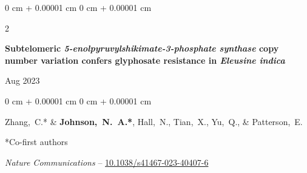 \documentclass[10pt, letterpaper]{article}
\newenvironment{onecolentry}{
    \begin{adjustwidth}{
        0 cm + 0.00001 cm
    }{
        0 cm + 0.00001 cm
    }
}{
    \end{adjustwidth}
} %
\newenvironment{twocolentry}[2][]{
    \onecolentry
    \def\secondColumn{#2}
    \setcolumnwidth{\fill, 4.5 cm}
    \begin{paracol}{2}
}{
    \switchcolumn \raggedleft \secondColumn
    \end{paracol}
    \endonecolentry
} %
\begin{document}
        \begin{samepage}
            \begin{twocolentry}{
                Aug 2023
            }
                \textbf{Subtelomeric \textit{5-enolpyruvylshikimate-3-phosphate synthase} copy number variation confers glyphosate resistance in \textit{Eleusine indica}}
            \end{twocolentry}

            \vspace{0.10 cm}
            
            \begin{onecolentry}
                \mbox{Zhang, C.}* \& \mbox{\textbf{Johnson, N. A.*}}, \mbox{Hall, N.}, \mbox{Tian, X.}, \mbox{Yu, Q.}, \& \mbox{Patterson, E.}

                \vspace{0.10 cm}

                *Co-first authors
                
                \vspace{0.10 cm}
                
                \textit{Nature Communications} -- \href{https://doi.org/10.1038/s41467-023-40407-6}{10.1038/s41467-023-40407-6}
            \end{onecolentry}
        \end{samepage}


        

%
%            
%
%                
\end{document}
